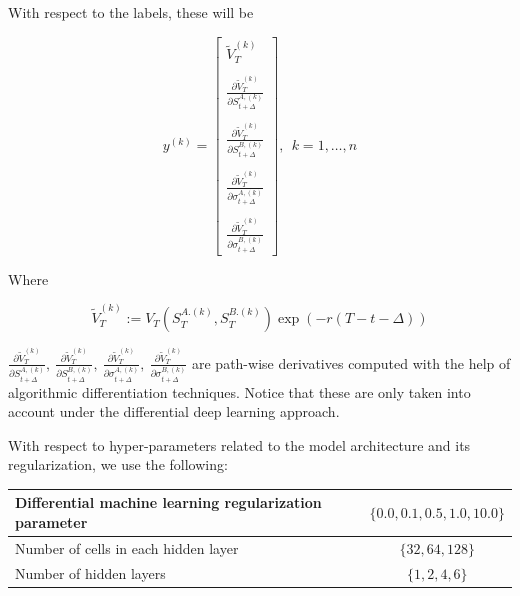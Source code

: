 With respect to the labels, these will be 

$$
y^{(k)}=\left[\begin{array}{l}
\tilde{V}_{T}^{(k)} \\ \\
\frac{\partial \tilde{V}_{T}^{(k)}}{\partial S_{t+\Delta}^{A,(k)}} \\ \\
\frac{\partial \tilde{V}_{T}^{(k)}}{\partial S_{t+\Delta}^{B,(k)}} \\ \\
\frac{\partial \tilde{V}_{T}^{(k)}}{\partial \sigma_{t+\Delta}^{A,(k)}} \\ \\
\frac{\partial \tilde{V}_{T}^{(k)}}{\partial \sigma_{t+\Delta}^{B,(k)}}
\end{array}\right],\ \ k=1, \ldots, n
$$

Where

$$\tilde{V}_{T}^{(k)} := V_T\left(S_T^{A.(k)}, S_T^{B.(k)}\right)\exp\left(-r\left(T-t-\Delta\right)\right)$$

$\frac{\partial \tilde{V}_{T}^{(k)}}{\partial S_{t+\Delta}^{A,(k)}},\  
\frac{\partial \tilde{V}_{T}^{(k)}}{\partial S_{t+\Delta}^{B,(k)}},\ 
\frac{\partial \tilde{V}_{T}^{(k)}}{\partial \sigma_{t+\Delta}^{A,(k)}},\ 
\frac{\partial \tilde{V}_{T}^{(k)}}{\partial \sigma_{t+\Delta}^{B,(k)}}
$ are path-wise derivatives computed with the help of algorithmic differentiation techniques. Notice that these are only taken into account under the differential deep learning approach.

With respect to hyper-parameters related to the model architecture and its regularization, we use the following:



\begin{center}
\begin{tabular}{||l | c||} 
 \hline
 Differential machine learning regularization parameter & $\{0.0, 0.1, 0.5, 1.0, 10.0\}$ \\
 \hline
 Number of cells in each hidden layer  & $\{32, 64, 128\}$  \\
 \hline
 Number of hidden layers  & $\{1 ,2 ,4 ,6\}$  \\
 \hline
 \end{tabular}
\end{center}


